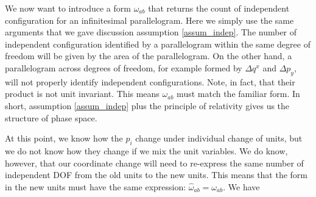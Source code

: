 We now want to introduce a form $\omega_{ab}$ that returns the count of independent configuration for an infinitesimal parallelogram. Here we simply use the same arguments that we gave discussion assumption \ref{assum_indep}. The number of independent configuration identified by a parallelogram within the same degree of freedom will be given by the area of the parallelogram. On the other hand, a parallelogram across degrees of freedom, for example formed by $\Delta q^x$ and $\Delta p_y$, will not properly identify independent configurations. Note, in fact, that their product is not unit invariant. This means $\omega_{ab}$ must match the familiar form. In short, assumption \ref{assum_indep} plus the principle of relativity gives us the structure of phase space.

At this point, we know how the $p_i$ change under individual change of units, but we do not know how they change if we mix the unit variables. We do know, however, that our coordinate change will need to re-express the same number of independent DOF from the old units to the new units. This means that the form in the new units must have the same expression: $\hat{\omega}_{ab} = \omega_{ab}$. We have
